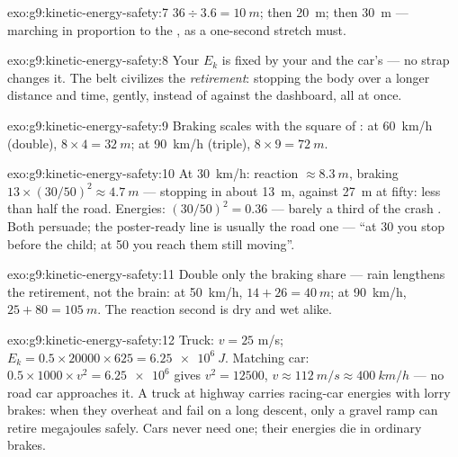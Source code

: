 \begin{solution}{exo:g9:kinetic-energy-safety:7}
$36 \div 3.6 = \qty{10}{m}$; then \qty{20}{m}; then
\qty{30}{m} --- marching in proportion to the , as a
one-second stretch must.
\end{solution}

\begin{solution}{exo:g9:kinetic-energy-safety:8}
Your $E_k$ is fixed by your  and the car's  --- no
strap changes it. The belt civilizes the \emph{retirement}:
stopping the body over a longer distance and time, gently,
instead of against the dashboard, all at once.
\end{solution}

\begin{solution}{exo:g9:kinetic-energy-safety:9}
Braking scales with the square of : at \qty{60}{km/h}
(double), $8 \times 4 = \qty{32}{m}$; at \qty{90}{km/h}
(triple), $8 \times 9 = \qty{72}{m}$.
\end{solution}

\begin{solution}{exo:g9:kinetic-energy-safety:10}
At \qty{30}{km/h}: reaction $\approx \qty{8.3}{m}$, braking
$13 \times (30/50)^2 \approx \qty{4.7}{m}$ --- stopping in
about \qty{13}{m}, against \qty{27}{m} at fifty: less than
half the road. Energies: $(30/50)^2 = 0.36$ --- barely a
third of the crash . Both persuade; the poster-ready
line is usually the road one --- ``at 30 you stop before the
child; at 50 you reach them still moving''.
\end{solution}

\begin{solution}{exo:g9:kinetic-energy-safety:11}
Double only the braking share --- rain lengthens the
retirement, not the brain: at \qty{50}{km/h}, $14 + 26 =
\qty{40}{m}$; at \qty{90}{km/h}, $25 + 80 = \qty{105}{m}$.
The reaction second is dry and wet alike.
\end{solution}

\begin{solution}{exo:g9:kinetic-energy-safety:12}
Truck: $v = 25$ \unit{m/s}; $E_k = 0.5 \times 20000 \times
625 = \qty{6.25e6}{J}$. Matching car: $0.5 \times 1000 \times
v^2 = \num{6.25e6}$ gives $v^2 = 12500$, $v \approx
\qty{112}{m/s} \approx \qty{400}{km/h}$ --- no road car
approaches it. A truck at highway  carries racing-car
energies with lorry brakes: when they overheat and fail on a
long descent, only a gravel ramp can retire megajoules
safely. Cars never need one; their energies die in ordinary
brakes.
\end{solution}

